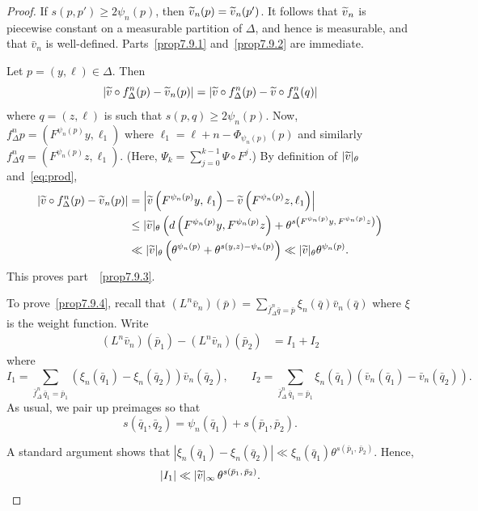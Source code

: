 \documentclass[AHL,Unicode,longabstracts,published]{cedram}
\newcommand{\tv}{\tilde{v}}
\let\oldtilde\tilde
\renewcommand*{\tilde}[1]{\mathchoice{\widetilde{#1}}{\widetilde{#1}}{\oldtilde{#1}}{\oldtilde{#1}}}
\begin{document}
\begin{proof}
If $s(p,p')\ge 2\psi_n(p)$, then $\tv_n(p)=\tv_n(p')$. It follows that $\tv_n$ is piecewise constant on a measurable partition of $\Delta$, and hence is measurable, and that $\bar v_n$ is well-defined. Parts~\eqref{prop7.9.1} and~\eqref{prop7.9.2} are immediate.

Let $p=(y,\ell)\in\Delta$. Then
\[
\left|\tv\circ f_\Delta^n(p)-\tv_n(p)\right| =\left|\tv\circ f_\Delta^n(p)-\tv\circ f_\Delta^n(q)\right|
\]
where $q=(z,\ell)$ is such that $s(p,q)\ge 2\psi_n(p)$. Now, $f_\Delta^np=(F^{\psi_n(p)}y,\ell_1)$ where $\ell_1=\ell+n-\Phi_{\psi_n(p)}(p)$ and similarly $f_\Delta^nq=(F^{\psi_n(p)}z,\ell_1)$. (Here, $\Psi_k=\sum_{j=0}^{k-1}\Psi\circ F^j$.) By definition of $|\tv|_\theta$ and~\eqref{eq:prod},
\begin{align*}
\left|\tv\circ f_\Delta^n(p)-\tv_n(p)\right| & = \left|\tv\left(F^{\psi_n(p)}y,\,\ell_1\right) -\tv\left(F^{\psi_n(p)}z,\ell_1\right)\right|
\\ & \le |\tv|_\theta\left(d\left(F^{\psi_n(p)}y,F^{\psi_n(p)}z\right)+\theta^{s\left(F^{\psi_n(p)}y,\,F^{\psi_n(p)}z\right)}\right)
\\ & \ll |\tv|_\theta \left(\theta^{\psi_n(p)}+\theta^{s(y,z)-\psi_n(p)}\right)
\ll |\tv|_\theta \theta^{\psi_n(p)}.
\end{align*}
This proves part~~\eqref{prop7.9.3}.

To prove~\eqref{prop7.9.4}, recall that $(L^n\bar v_n)(\bar p)=\sum_{\bar f_\Delta^n\bar q=\bar p}\xi_n(\bar q)\bar v_n(\bar q)$ where $\xi$ is the weight function. Write
\begin{align*}
(L^n\bar v_n)(\bar p_1)- (L^n\bar v_n)(\bar p_2) & = I_1+I_2
\end{align*}
where
\[
I_1 = \sum_{\bar f_\Delta^n\,\bar q_1=\bar p_1}\left(\xi_n(\bar q_1)-\xi_n(\bar q_2)\right)\bar v_n(\bar q_2), \qquad I_2 = \sum_{\bar f_\Delta^n\,\bar q_1=\bar p_1}\xi_n(\bar q_1)\left(\bar v_n(\bar q_1)-\bar v_n(\bar q_2)\right).
\]
As usual, we pair up preimages so that
\begin{equation}\label{eq:pairs}
s(\bar q_1,\bar q_2)=\psi_n(\bar q_1)+s(\bar p_1,\bar p_2).
\end{equation}

A standard argument shows that $|\xi_n(\bar q_1)-\xi_n(\bar q_2)|\ll \xi_n(\bar q_1)\theta^{s(\bar p_1,\,\bar p_2)}$. Hence,
\[
|I_1|\ll |\tv|_\infty\, \theta^{s\left(\bar p_1,\,\bar p_2\right)}.
\]


\end{proof}
\end{document}
